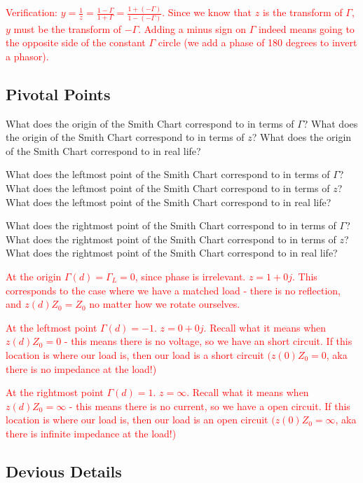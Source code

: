 \documentclass{article}
\begin{document}
\textcolor{red}{Verification: $y = \frac{1}{z} = \frac{1 - \Gamma}{1 + \Gamma} = \frac{1 + (-\Gamma)}{1 - (-\Gamma)}$. Since we know that $z$ is the transform of $\Gamma$, $y$ must be the transform of $-\Gamma$. Adding a minus sign on $\Gamma$ indeed means going to the opposite side of the constant $\Gamma$ circle (we add a phase of 180 degrees to invert a phasor).}

\vfill

\subsection{Pivotal Points}

What does the origin of the Smith Chart correspond to in terms of $\Gamma$? What does the origin of the Smith Chart correspond to in terms of $z$? What does the origin of the Smith Chart correspond to in real life?

What does the leftmost point of the Smith Chart correspond to in terms of $\Gamma$? What does the leftmost point of the Smith Chart correspond to in terms of $z$? What does the leftmost point of the Smith Chart correspond to in real life?

What does the rightmost point of the Smith Chart correspond to in terms of $\Gamma$? What does the rightmost point of the Smith Chart correspond to in terms of $z$? What does the rightmost point of the Smith Chart correspond to in real life?

\textcolor{red}{At the origin $\Gamma(d) = \Gamma_L = 0$, since phase is irrelevant. $z = 1 + 0j$. This corresponds to the case where we have a matched load - there is no reflection, and $z(d)Z_0 = Z_0$ no matter how we rotate ourselves.}

\textcolor{red}{At the leftmost point $\Gamma(d) = -1$. $z = 0 + 0j$. Recall what it means when $z(d)Z_0 = 0$ - this means there is no voltage, so we have an short circuit. If this location is where our load is, then our load is a short circuit $(z(0)Z_0 = 0$, aka there is no impedance at the load!)}

\textcolor{red}{At the rightmost point $\Gamma(d) = 1$. $z = \infty$. Recall what it means when $z(d)Z_0 = \infty$ - this means there is no current, so we have a open circuit. If this location is where our load is, then our load is an open circuit $(z(0)Z_0 = \infty$, aka there is infinite impedance at the load!)}

\vfill
\newpage

\subsection{Devious Details}
\end{document}
